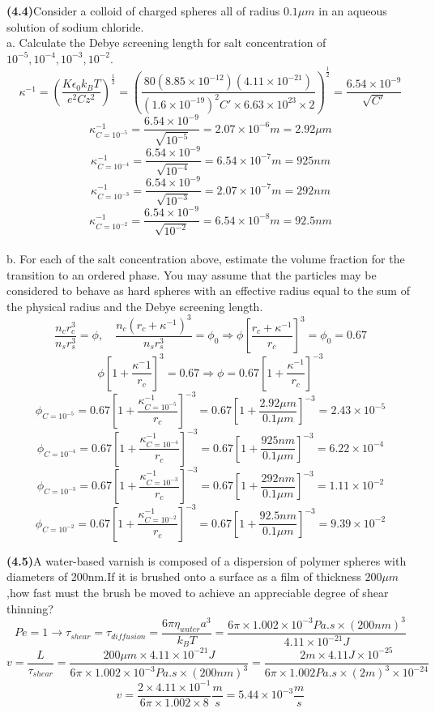 \documentclass[a4paper,12pt]{report}
\begin{document}
\textbf{(4.4)}Consider a colloid of charged spheres all of radius $0.1\mu m$ in an aqueous solution of sodium chloride.\\a. Calculate the Debye screening length for salt concentration of $10^{-5}, 10^{-4}, 10^{-3}, 10^{-2}$.
\[
\kappa^{-1} = (\frac{K\epsilon_0 k_BT}{e^2Cz^2})^{\frac{1}{2}} =  (\frac{80 (8.85 \times 10^{-12}) (4.11 \times 10^{-21})}{(1.6 \times 10^{-19})^2C'\times 6.63\times 10^{23}\times 2})^{\frac{1}{2}} = \frac{6.54\times 10^{-9}}{\sqrt{C'}}
\]
\[
\kappa^{-1}_{C=10^{-5}} = \frac{6.54\times 10^{-9}}{\sqrt{10^{-5}}} = 2.07\times 10^{-6}m =2.92 \mu m
\]
\[
\kappa^{-1}_{C=10^{-4}} = \frac{6.54\times 10^{-9}}{\sqrt{10^{-4}}} = 6.54\times 10^{-7}m = 925 n m
\]
\[
\kappa^{-1}_{C=10^{-3}} = \frac{6.54\times 10^{-9}}{\sqrt{10^{-3}}} = 2.07\times 10^{-7}m = 292 n m
\]
\[
\kappa^{-1}_{C=10^{-2}} = \frac{6.54\times 10^{-9}}{\sqrt{10^{-2}}} = 6.54\times 10^{-8}m = 92.5 n m
\]\\b. For each of the salt concentration above, estimate the volume fraction for the transition to an ordered phase. You may assume that the particles may be considered to behave as hard spheres with an effective radius equal to the sum of the physical radius and the Debye screening length.
\[
\frac{n_cr_c^3}{n_sr_s^3}= \phi,\quad \frac{n_c(r_c+\kappa ^{-1})^3}{n_sr_s^3}= \phi_0\Rightarrow \phi [\frac{r_c+\kappa^{-1}}{r_c} ]^3 = \phi_0 =0.67
\]
\[
\phi[1+\frac{\kappa ^-1}{r_c}]^3 = 0.67 \Rightarrow \phi=0.67[1+\frac{\kappa ^{-1}}{r_c}]^{-3}
\]
\[
\phi_{C=10^{-5}}=0.67[1+\frac{\kappa ^{-1}_{C=10^{-5}}}{r_c}]^{-3} =0.67[1+\frac{2.92 \mu m}{0.1 \mu m}]^{-3}=2.43\times 10^{-5}
\]
\[
\phi_{C=10^{-4}}=0.67[1+\frac{\kappa ^{-1}_{C=10^{-4}}}{r_c}]^{-3} =0.67[1+\frac{925 n m}{0.1 \mu m}]^{-3}=6.22 \times 10^{-4}
\]
\[
\phi_{C=10^{-3}}=0.67[1+\frac{\kappa ^{-1}_{C=10^{-3}}}{r_c}]^{-3} =0.67[1+\frac{292 n m}{0.1 \mu m}]^{-3}=1.11\times 10^{-2}
\]
\[
\phi_{C=10^{-2}}=0.67[1+\frac{\kappa ^{-1}_{C=10^{-2}}}{r_c}]^{-3} =0.67[1+\frac{92.5 n m}{0.1 \mu m}]^{-3} = 9.39 \times 10^{-2}
\]

\textbf{(4.5)}A water-based varnish is composed of a dispersion of polymer spheres with diameters of 200nm.If it is brushed onto a surface as a film of thickness $200\mu m$,how fast must the brush be moved to achieve an appreciable degree of shear thinning?
\[
Pe =1 \to \tau_{shear} = \tau_{diffusion} =\frac{6\pi \eta_{water} a^3}{k_BT} =\frac{6\pi \times 1.002 \times 10^{-3} Pa.s \times (200nm)^3}{4.11\times 10^{-21}J}
\]
\[
v = \frac{L}{\tau_{shear}} = \frac{200\mu m \times 4.11\times 10^{-21}J}{6\pi \times 1.002 \times 10^{-3} Pa.s \times (200nm)^3} = \frac{2 m \times 4.11 J \times 10^{-25}}{6\pi\times  1.002Pa.s\times (2m)^3\times 10^{-24}}
\]
\[
v = \frac{2  \times 4.11  \times 10^{-1}}{6\pi\times  1.002\times 8}\frac{m}{s}=5.44\times10^{-3}\frac{m}{s}
\]
\end{document}

